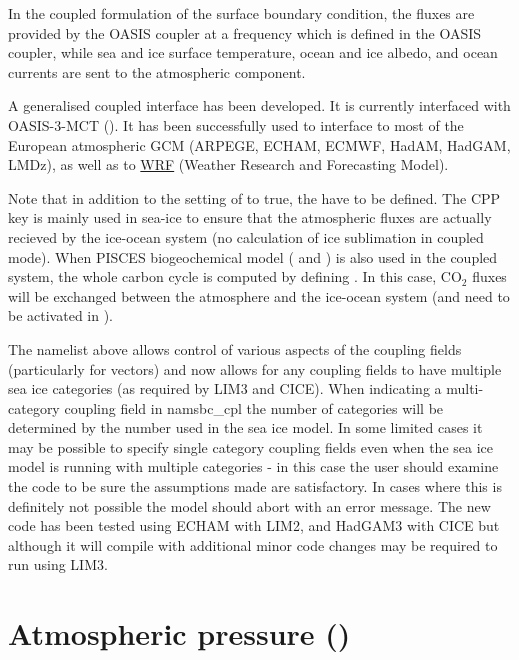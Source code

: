 \documentclass[../tex_main/NEMO_manual]{subfiles}
\begin{document}
In the coupled formulation of the surface boundary condition, the fluxes are 
provided by the OASIS coupler at a frequency which is defined in the OASIS coupler, 
while sea and ice surface temperature, ocean and ice albedo, and ocean currents 
are sent to the atmospheric component.

A generalised coupled interface has been developed. 
It is currently interfaced with OASIS-3-MCT (). 
It has been successfully used to interface \NEMO to most of the European atmospheric 
GCM (ARPEGE, ECHAM, ECMWF, HadAM, HadGAM, LMDz), 
as well as to \href{http://wrf-model.org/}{WRF} (Weather Research and Forecasting Model).

Note that in addition to the setting of  to true, the  have to be defined. 
The CPP key is mainly used in sea-ice to ensure that the atmospheric fluxes are 
actually recieved by the ice-ocean system (no calculation of ice sublimation in coupled mode).
When PISCES biogeochemical model ( and ) is also used in the coupled system, 
the whole carbon cycle is computed by defining . In this case, 
CO$_2$ fluxes will be exchanged between the atmosphere and the ice-ocean system (and need to be activated in  ).

The namelist above allows control of various aspects of the coupling fields (particularly for
vectors) and now allows for any coupling fields to have multiple sea ice categories (as required by LIM3
and CICE).  When indicating a multi-category coupling field in namsbc{\_}cpl the number of categories will be
determined by the number used in the sea ice model.  In some limited cases it may be possible to specify 
single category coupling fields even when the sea ice model is running with multiple categories - in this
case the user should examine the code to be sure the assumptions made are satisfactory.  In cases where
this is definitely not possible the model should abort with an error message.  The new code has been tested using
ECHAM with LIM2, and HadGAM3 with CICE but although it will compile with  additional minor code changes
may be required to run using LIM3.


\section{Atmospheric pressure (\protect{})}
\label{sec:SBC_apr}
\end{document}
